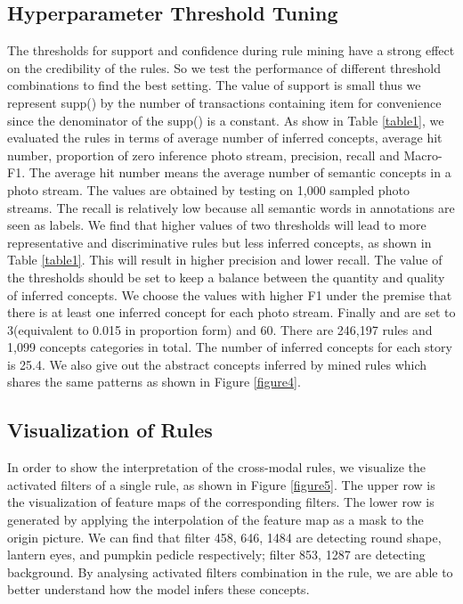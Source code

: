 \documentclass[sigconf]{acmart}
\begin{document}
\subsection{Hyperparameter Threshold Tuning}
The thresholds for support and confidence during rule mining have a strong effect on the credibility of the rules. So we test the performance of different threshold combinations to find the best setting. The value of support is small thus we represent supp() by the number of transactions containing item  for convenience since the denominator of the supp() is a constant.
As show in Table \ref{table1}, we evaluated the rules in terms of average number of inferred concepts, average hit number, proportion of zero inference photo stream, precision, recall and Macro-F1. The average hit number means the average number of semantic concepts in a photo stream. The values are obtained by testing on 1,000 sampled photo streams. The recall is relatively low because all semantic words in annotations are seen as labels. We find that higher values of two thresholds will lead to more representative and discriminative rules but less inferred concepts, as shown in Table \ref{table1}. This will result in higher precision and lower recall. The value of the thresholds should be set to keep a balance between the quantity and quality of inferred concepts. We choose the values with higher F1 under the premise that there is at least one inferred concept for each photo stream.  Finally  and  are set to 3(equivalent to 0.015 in proportion form) and 60. There are 246,197 rules and 1,099 concepts categories in total. The number of inferred concepts for each story is 25.4. We also give out the abstract concepts inferred by mined rules which shares the same patterns as shown in Figure \ref{figure4}.

\subsection{Visualization of Rules}
In order to show the interpretation of the cross-modal rules, we visualize the activated filters of a single rule, as shown in Figure \ref{figure5}. The upper row is the visualization of feature maps of the corresponding filters. The lower row is generated by applying the interpolation of the feature map as a mask to the origin picture. We can find that filter 458, 646, 1484 are detecting round shape, lantern eyes, and pumpkin pedicle respectively; filter 853, 1287 are detecting background. By analysing activated filters combination in the rule, we are able to better understand how the model infers these concepts.
\end{document}
